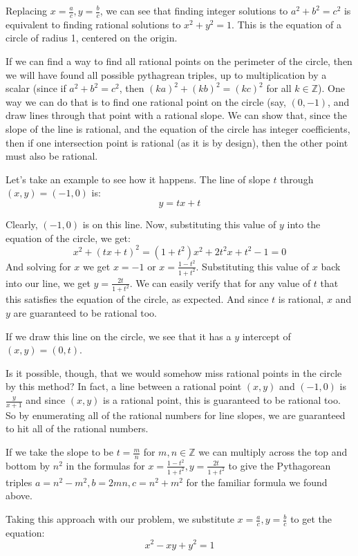 \documentclass{article}
\begin{document}
Replacing $x = \frac{a}{c}, y = \frac{b}{c}$, we can see that finding integer solutions to $a^2 + b^2 = c^2$
is equivalent to finding rational solutions to $x^2 + y^2 = 1$. This is the equation of a circle of radius 1,
centered on the origin.

If we can find a way to find all rational points on the perimeter of the circle, then we will have found all
possible pythagrean triples, up to multiplication by a scalar (since if $a^2 + b^2 = c^2$, then
$(ka)^2 + (kb)^2 = (kc)^2$ for all $k \in \mathbb{Z}$). One way we can do that is to find one rational
point on the circle (say, $(0,-1)$, and draw lines through that point with a rational slope. We can show
that, since the slope of the line is rational, and the equation of the circle has integer coefficients, then
if one intersection point is rational (as it is by design), then the other point must also be rational.

Let's take an example to see how it happens. The line of slope $t$ through $(x,y) = (-1,0)$ is:
\[ y = tx +t\]

Clearly, $(-1,0)$ is on this line. Now, substituting this value of $y$ into the equation of the circle,
we get:
\[x^2 + (tx+t)^2 = (1+t^2)x^2 +2t^2x + t^2 -1 = 0 \]
And solving for $x$ we get $x = -1$ or $x = \frac{1-t^2}{1+t^2}$. Substituting this value of $x$ back into
our line, we get $y = \frac{2t}{1+t^2}$. We can easily verify that for any value of $t$ that this satisfies
the equation of the circle, as expected. And since $t$ is rational, $x$ and $y$ are guaranteed to be
rational too.

If we draw this line on the circle, we see that it has a $y$ intercept of $(x,y) = (0,t)$.

Is it possible, though, that we would somehow miss rational points in the circle by this method? 
In fact, a line between a rational point $(x,y)$ and $(-1,0)$ is $\frac{y}{x+1}$ and since $(x,y)$ is
a rational point, this is guaranteed to be rational too. So by enumerating all of the rational numbers
for line slopes, we are guaranteed to hit all of the rational numbers.

If we take the slope to be $t = \frac{m}{n}$ for $m,n \in \mathbb{Z}$ we can multiply across the
top and bottom by $n^2$ in the formulas for $x = \frac{1-t^2}{1+t^2}, y = \frac{2t}{1+t^2}$ to give
the Pythagorean triples $a = n^2-m^2, b = 2mn, c = n^2 + m^2$ for the familiar formula we found above.

Taking this approach with our problem, we substitute $x = \frac{a}{c}, y = \frac{b}{c}$ to get the equation:
\[ x^2 - xy + y^2 = 1 \]
\end{document}
